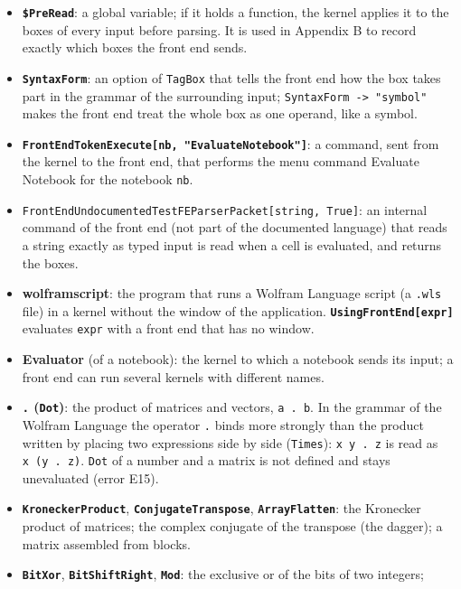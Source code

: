 \documentclass[
  10pt,
]{article}
\begin{document}
\begin{itemize}
  simplification; factorization; multiplication of products.
\item
  \textbf{\texttt{\$PreRead}}: a global variable; if it holds a
  function, the kernel applies it to the boxes of every input before
  parsing. It is used in Appendix B to record exactly which boxes the
  front end sends.
\item
  \textbf{\texttt{SyntaxForm}}: an option of \texttt{TagBox} that tells
  the front end how the box takes part in the grammar of the surrounding
  input; \texttt{SyntaxForm\ -\textgreater{}\ "symbol"} makes the front
  end treat the whole box as one operand, like a symbol.
\item
  \textbf{\texttt{FrontEndTokenExecute{[}nb,\ "EvaluateNotebook"{]}}}: a
  command, sent from the kernel to the front end, that performs the menu
  command Evaluate Notebook for the notebook \texttt{nb}.
\item
  \texttt{FrontEnd\textasciigrave{}UndocumentedTestFEParserPacket{[}string,\ True{]}}:
  an internal command of the front end (not part of the documented
  language) that reads a string exactly as typed input is read when a
  cell is evaluated, and returns the boxes.
\item
  \textbf{wolframscript}: the program that runs a Wolfram Language
  script (a \texttt{.wls} file) in a kernel without the window of the
  application. \textbf{\texttt{UsingFrontEnd{[}expr{]}}} evaluates
  \texttt{expr} with a front end that has no window.
\item
  \textbf{Evaluator} (of a notebook): the kernel to which a notebook
  sends its input; a front end can run several kernels with different
  names.
\item
  \textbf{\texttt{.} (\texttt{Dot})}: the product of matrices and
  vectors, \texttt{a\ .\ b}. In the grammar of the Wolfram Language the
  operator \texttt{.} binds more strongly than the product written by
  placing two expressions side by side (\texttt{Times}):
  \texttt{x\ y\ .\ z} is read as \texttt{x\ (y\ .\ z)}. \texttt{Dot} of
  a number and a matrix is not defined and stays unevaluated (error
  E15).
\item
  \textbf{\texttt{KroneckerProduct}},
  \textbf{\texttt{ConjugateTranspose}}, \textbf{\texttt{ArrayFlatten}}:
  the Kronecker product of matrices; the complex conjugate of the
  transpose (the dagger); a matrix assembled from blocks.
\item
  \textbf{\texttt{BitXor}}, \textbf{\texttt{BitShiftRight}},
  \textbf{\texttt{Mod}}: the exclusive or of the bits of two integers;

\end{itemize}
\end{document}
